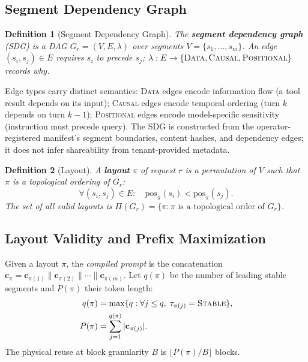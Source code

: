\documentclass[journal]{IEEEtran}
\newtheorem{definition}{Definition}
\begin{document}
\subsection{Segment Dependency Graph}

\begin{definition}[Segment Dependency Graph]
The \textbf{segment dependency graph} (SDG) is a DAG $G_r=(V,E,\lambda)$ over segments $V=\{s_1,\ldots,s_m\}$. An edge $(s_i,s_j)\in E$ requires $s_i$ to precede $s_j$; $\lambda:E\rightarrow\{\textsc{Data},\textsc{Causal},\textsc{Positional}\}$ records why.
\end{definition}

Edge types carry distinct semantics: \textsc{Data} edges encode information flow (a tool result depends on its input); \textsc{Causal} edges encode temporal ordering (turn $k$ depends on turn $k{-}1$); \textsc{Positional} edges encode model-specific sensitivity (instruction must precede query). The SDG is constructed from the operator-registered manifest's segment boundaries, content hashes, and dependency edges; it does not infer shareability from tenant-provided metadata.

\begin{definition}[Layout]
A \textbf{layout} $\pi$ of request $r$ is a permutation of $V$ such that $\pi$ is a \emph{topological ordering} of $G_r$:
\begin{equation}
  \forall (s_i, s_j) \in E: \quad \text{pos}_\pi(s_i) < \text{pos}_\pi(s_j).
\end{equation}
The set of all valid layouts is $\Pi(G_r) = \{\pi : \pi \text{ is a topological order of } G_r\}$.
\end{definition}

\subsection{Layout Validity and Prefix Maximization}

Given a layout $\pi$, the \emph{compiled prompt} is the concatenation $\mathbf{c}_\pi = \mathbf{c}_{\pi(1)} \| \mathbf{c}_{\pi(2)} \| \cdots \| \mathbf{c}_{\pi(m)}$. Let $q(\pi)$ be the number of leading stable segments and $P(\pi)$ their token length:
\begin{equation}
\begin{aligned}
q(\pi)&=\max\{q:\forall j\leq q,\;\tau_{\pi(j)}=\textsc{Stable}\},\\
P(\pi)&=\sum_{j=1}^{q(\pi)}|\mathbf{c}_{\pi(j)}|.
\end{aligned}
\end{equation}
The physical reuse at block granularity $B$ is $\lfloor P(\pi) / B \rfloor$ blocks.
\end{document}
